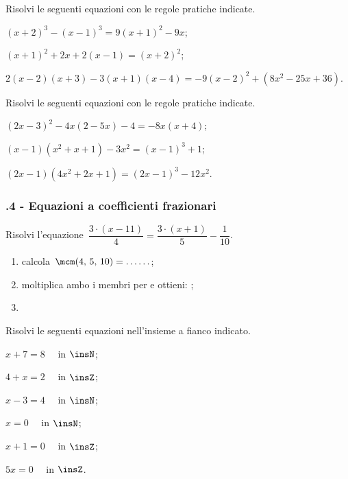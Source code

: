 \begin{esercizio}[\Ast]
\label{ese:13.17}
Risolvi le seguenti equazioni con le regole pratiche indicate.
 \begin{enumeratea}
 \item $(x+2)^{3}-(x-1)^{3}=9(x+1)^{2}-9x$;
 \item $(x+1)^{2}+2x+2(x-1)=(x+2)^{2}$;
 \item $2(x-2)(x+3)-3(x+1)(x-4)=-9(x-2)^{2}+\left(8x^{2}-25x+36\right)$.
 \end{enumeratea}
\end{esercizio}

\begin{esercizio}
\label{ese:13.18}
Risolvi le seguenti equazioni con le regole pratiche indicate.
 \begin{enumeratea}
 \item $(2x-3)^{2}-4x(2-5x)-4=-8x(x+4)$;
 \item $(x-1)\left(x^{2}+x+1\right)-3x^{2}=(x-1)^{3}+1$;
 \item $(2x-1)\left(4x^{2}+2x+1\right)=(2x-1)^{3}-12x^{2}$.
 \end{enumeratea}
\end{esercizio}


\subsubsection*{\thechapter.4 - Equazioni a coefficienti frazionari}

\begin{esercizio}
\label{ese:13.19}
Risolvi l'equazione~$\dfrac{3\cdot (x-11)}{4}=\dfrac{3\cdot (x+1)}{5}-\dfrac{1}{10}$.
\begin{enumerate}
\spazielenx
 \item calcola~$\mcm(4\text{,~}5\text{,~}10) = \ldots \ldots$;
 \item moltiplica ambo i membri per \dotfill e ottieni: \dotfill;
 \item \dotfill
\end{enumerate}
\end{esercizio}

\begin{esercizio}
\label{ese:13.20}
Risolvi le seguenti equazioni nell'insieme a fianco indicato.
\begin{multicols}{3}
\begin{enumeratea}
\spazielenx
 \item $x+7=8\quad$ in $\insN$;
 \item $4+x=2\quad$ in $\insZ$;
 \item $x-3=4\quad$ in $\insN$;
 \item $x=0\quad$ in $\insN$;
 \item $x+1=0\quad$ in $\insZ$;
 \item $5x=0\quad$ in $\insZ$.
\end{enumeratea}
\end{multicols}
\end{esercizio}

